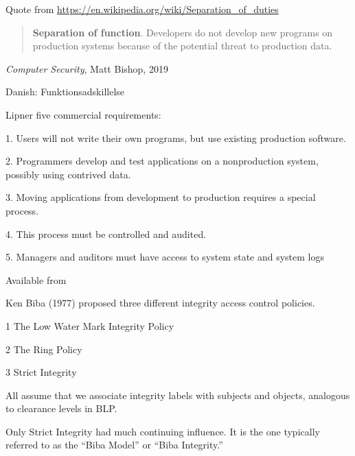 \documentclass[Screen16to9,17pt]{foils}
\begin{document}
Quote from \url{https://en.wikipedia.org/wiki/Separation_of_duties}

\begin{quote}
{\bf Separation of function}. Developers do not develop new programs on production systems because of the potential threat to production data.
\end{quote}
\emph{Computer Security}, Matt Bishop, 2019

Danish: Funktionsadskillelse




Lipner five commercial requirements:
\begin{list2}
\item[1.] Users will not write their own programs, but use existing
  production software.
\item[2.] Programmers develop and test applications on a nonproduction system, possibly using contrived data.
\item[3.] Moving applications from development to production requires a special process.
\item[4.] This process must be controlled and audited.
\item[5.] Managers and auditors must have access to system state and system logs
\end{list2}


Available from\\ {\footnotesize{}}




Ken Biba (1977) proposed three different integrity access control
policies.

\begin{list2}
\item[1] The Low Water Mark Integrity Policy
\item[2] The Ring Policy
\item[3] Strict Integrity
\item All assume that we associate integrity labels with subjects and
objects, analogous to clearance levels in BLP.
\item Only Strict Integrity had much continuing influence. It is the one
typically referred to as the “Biba Model” or “Biba Integrity.”
\end{list2}
\end{document}
